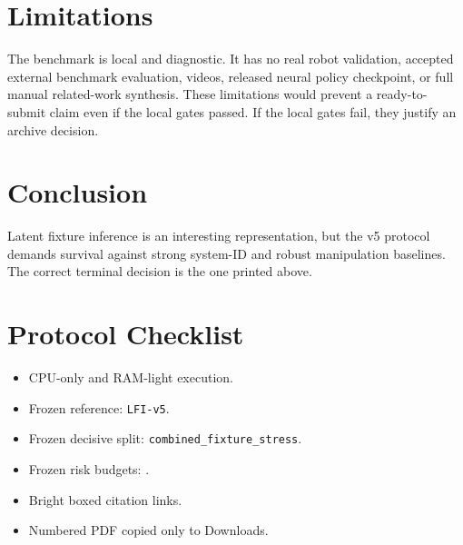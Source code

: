 \documentclass{article}
\begin{document}
\section{Limitations}
The benchmark is local and diagnostic.  It has no real robot validation, accepted external benchmark evaluation, videos, released neural policy checkpoint, or full manual related-work synthesis.  These limitations would prevent a ready-to-submit claim even if the local gates passed.  If the local gates fail, they justify an archive decision.

\section{Conclusion}
Latent fixture inference is an interesting representation, but the v5 protocol demands survival against strong system-ID and robust manipulation baselines.  The correct terminal decision is the one printed above.

\appendix
\section{Protocol Checklist}
\begin{itemize}
\item CPU-only and RAM-light execution.
\item Frozen reference: \texttt{LFI-v5}.
\item Frozen decisive split: \texttt{combined\_fixture\_stress}.
\item Frozen risk budgets: .
\item Bright boxed citation links.
\item Numbered PDF copied only to Downloads.
\end{itemize}
\end{document}
